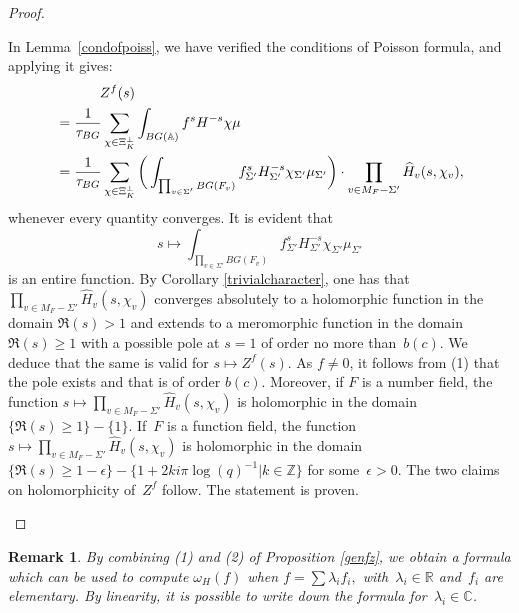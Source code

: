 \documentclass[a4paper,english,12pt]{amsart}
\newcommand{\GG}{ G}
\newcommand{\RR}{\mathbb{R}}
\newcommand{\CC}{\mathbb{C}}
\newcommand{\ZZ}{\mathbb{Z}}
\newcommand{\Ov}{\mathcal O _v}
\newcommand{\vMF}{v\in M_F}
\newcommand{\AAA}{\mathbb A}
\newcommand{\wH}{\widehat H}
\newtheorem{rem}[equation]{Remark}
\numberwithin{equation}{subsection}
\begin{document}
\begin{proof}
\begin{enumerate}
In Lemma~\ref{condofpoiss}, we have verified the conditions of Poisson formula, and applying it gives:
\begin{align*}
Z^f(s)\hskip-2cm&\\&=\frac{1}{\tau_{BG}}\sum_{\chi\in \Xi^{\perp}_K}\int_{BG(\AAA)}f^sH^{-s}\chi\mu\\
&=\frac{1}{\tau_{BG}}\sum_{\chi\in \Xi^{\perp}_K}\bigg(\int_{\prod_{v\in \Sigma'}BG(F_v)}f_{\Sigma'}^sH_{\Sigma'}^{-s}\chi_{\Sigma'}\mu_{\Sigma'}\bigg) \cdot \prod_{v\in M_F-\Sigma'}\wH_v(s,\chi_v),
\end{align*}
whenever every quantity converges. It is evident that $$s\mapsto \int_{\prod_{v\in \Sigma'}BG(F_v)}f_{\Sigma'}^sH_{\Sigma'}^{-s}\chi_{\Sigma'}\mu_{\Sigma'}$$ is an entire function. By Corollary \ref{trivialcharacter}, one has that $\prod_{v\in M_F-\Sigma'}\wH_v(s,\chi_v)$ converges absolutely to a holomorphic function in the domain $\Re(s)>1$ and extends to a meromorphic function in the domain $\Re(s)\geq 1$ with a possible pole at $s=1$ of order no more than~$b(c)$.  We deduce that the same is valid for $s\mapsto Z^f(s)$. As $f\neq 0$, it follows from (1) that the pole exists and that is of order $b(c)$. Moreover, if $F$ is a number field, the function $s\mapsto\prod_{v\in M_F-\Sigma'}\wH_v(s,\chi_v)$ is holomorphic in the domain $\{\Re(s)\geq 1\}-\{1\}$. If~$F$ is a function field, the function $s\mapsto\prod_{v\in M_F-\Sigma'}\wH_v(s,\chi_v)$ is holomorphic in the domain $\{\Re(s)\geq 1-\epsilon\}-\{1+2ki\pi\log(q)^{-1}|k\in\ZZ\}$ for some~$\epsilon>0$. The two claims on holomorphicity of~$Z^f$ follow. The statement is proven.
\end{enumerate}
\end{proof}
\begin{rem}
\normalfont
By combining (1) and (2) of Proposition \ref{genfz}, we obtain a formula which can be used to compute $\omega_H(f)$ when $f=\sum \lambda_if_i,$ with~$\lambda_i\in\RR$ and~$f_i$ are elementary. By linearity, it is possible to write down the formula for~$\lambda_i\in\CC$. 
\end{rem}
\end{document}
